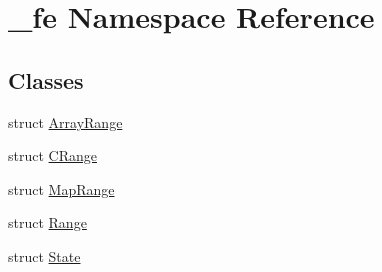 \hypertarget{namespace__fe}{}\section{\+\_\+fe Namespace Reference}
\label{namespace__fe}
\subsection*{Classes}
\begin{DoxyCompactItemize}
\item 
struct \mbox{\hyperlink{struct__fe_1_1ArrayRange}{Array\+Range}}
\item 
struct \mbox{\hyperlink{struct__fe_1_1CRange}{C\+Range}}
\item 
struct \mbox{\hyperlink{struct__fe_1_1MapRange}{Map\+Range}}
\item 
struct \mbox{\hyperlink{struct__fe_1_1Range}{Range}}
\item 
struct \mbox{\hyperlink{struct__fe_1_1State}{State}}
\end{DoxyCompactItemize}
